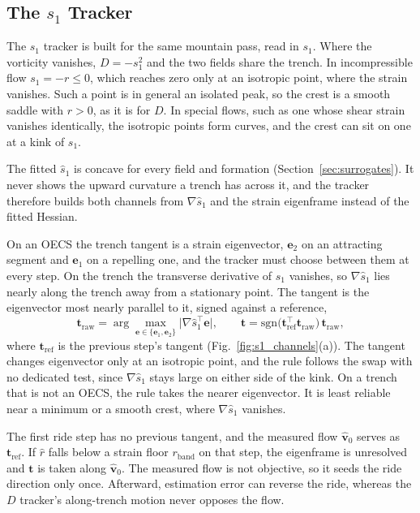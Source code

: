 \documentclass[lettersize,journal]{IEEEtran}
\begin{document}
\subsection{The $s_1$ Tracker}
\label{sec:s1_controller}

The $s_1$ tracker is built for the same mountain pass, read in $s_1$.
Where the vorticity vanishes, $D = -s_1^2$ and the two fields share the
trench. In incompressible flow
$s_1 = -r \leq 0$, which reaches zero only at an isotropic point, where the
strain vanishes. Such a point is in general an isolated peak, so the crest
is a smooth saddle with $r > 0$, as it is for $D$. In special flows, such
as one whose shear strain vanishes identically, the isotropic points form
curves, and the crest can sit on one at a kink of $s_1$.

The fitted $\hat{s}_1$ is concave for every field and formation
(Section~\ref{sec:surrogates}). It never shows the upward curvature a
trench has across it, and the tracker therefore builds both channels from
$\nabla\hat{s}_1$ and the strain eigenframe instead of the fitted Hessian.

On an OECS the trench tangent is a strain eigenvector, $\mathbf{e}_2$ on
an attracting segment and $\mathbf{e}_1$ on a repelling one, and the
tracker must choose between them at every step. On the trench the
transverse derivative of $s_1$ vanishes, so $\nabla\hat{s}_1$ lies nearly
along the trench away from a stationary point. The tangent is the
eigenvector most nearly parallel to it, signed against a reference,
\begin{equation}
    \mathbf{t}_{\mathrm{raw}} =
    \arg\max_{\mathbf{e} \in \{\mathbf{e}_1, \mathbf{e}_2\}}
    \bigl\lvert \nabla\hat{s}_1^\top \mathbf{e} \bigr\rvert,
    \qquad
    \mathbf{t} = \mathrm{sgn}\bigl(\mathbf{t}_{\mathrm{ref}}^\top
    \mathbf{t}_{\mathrm{raw}}\bigr)\,\mathbf{t}_{\mathrm{raw}},
    \label{eq:tangent_select}
\end{equation}
where $\mathbf{t}_{\mathrm{ref}}$ is the previous step's tangent
(Fig.~\ref{fig:s1_channels}(a)). The tangent changes eigenvector only at
an isotropic point, and the rule follows the swap with no dedicated test,
since $\nabla\hat{s}_1$ stays large on either side of the kink. On a
trench that is not an OECS, the rule takes the nearer eigenvector. It is
least reliable near a minimum or a smooth crest, where $\nabla\hat{s}_1$
vanishes.

The first ride step has no previous tangent, and the measured flow
$\hat{\mathbf{v}}_0$ serves as $\mathbf{t}_{\mathrm{ref}}$. If $\hat{r}$
falls below a strain floor $r_{\mathrm{band}}$ on that step, the
eigenframe is unresolved and $\mathbf{t}$ is taken along
$\hat{\mathbf{v}}_0$. The measured flow is not objective, so it seeds the
ride direction only once. Afterward, estimation error can reverse the
ride, whereas the $D$ tracker's along-trench motion never opposes the
flow.
\end{document}

